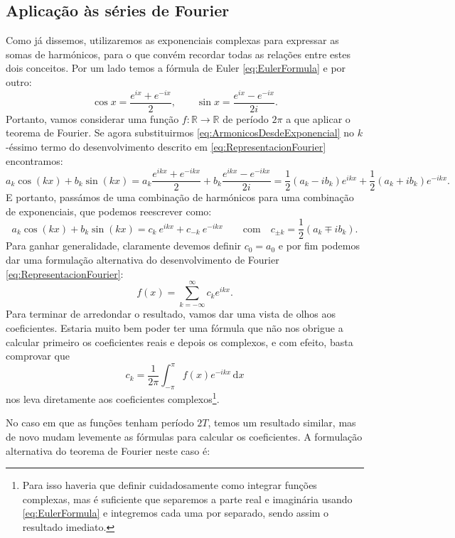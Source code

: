 \subsection{Aplicação às séries de Fourier}
Como já dissemos, utilizaremos as exponenciais complexas para expressar as somas de harmónicos, para o que convém recordar todas as relações entre estes dois conceitos. Por um lado temos a fórmula de Euler \eqref{eq:EulerFormula} e por outro:
\begin{equation}
  \label{eq:ArmonicosDesdeExponencial}
  \cos x = \frac{e^{ix} + e^{-ix}}{2}, \qquad \sin x = \frac{e^{ix} - e^{-ix}}{2i}.
\end{equation}
Portanto, vamos considerar uma função $f:\mathbb{R}\longrightarrow\mathbb{R}$ de período $2\pi$ a que aplicar o teorema de Fourier. Se agora substituirmos \eqref{eq:ArmonicosDesdeExponencial} no $k$-éssimo termo do desenvolvimento descrito em \eqref{eq:RepresentacionFourier} encontramos:
\[
a_k\cos(kx) + b_k\sin(kx) = a_k \frac{e^{ikx} + e^{-ikx}}{2} + b_k \frac{e^{ikx} - e^{-ikx}}{2i} = \frac{1}{2}(a_k-ib_k) e^{ikx} + \frac{1}{2}(a_k+ib_k) e^{-ikx}.
\]
E portanto, passámos de uma combinação de harmónicos para uma combinação de exponenciais, que podemos reescrever como:
\begin{equation}
  \label{eq:kesimoExponenciales}
  a_k\cos(kx) + b_k\sin(kx) = c_k\ e^{ikx} + c_{-k}\ e^{-ikx} \qquad \text{com}\quad c_{\pm k} = \frac{1}{2}(a_k \mp ib_k).
\end{equation}
Para ganhar generalidade, claramente devemos definir $c_0=a_0$ e por fim podemos dar uma formulação alternativa do desenvolvimento de Fourier \eqref{eq:RepresentacionFourier}:
\begin{equation}
  \label{eq:FourierComplejo}
  f(x) = \sum_{k=-\infty}^\infty c_k e^{ikx}.
\end{equation}
Para terminar de arredondar o resultado, vamos dar uma vista de olhos aos coeficientes. Estaria muito bem poder ter uma fórmula que não nos obrigue a calcular primeiro os coeficientes reais e depois os complexos, e com efeito, basta comprovar que
\[\boxed{
c_k = \frac{1}{2\pi} \int _{-\pi}^\pi f(x) e^{-ikx} \,\text{d}x
}\]
nos leva diretamente aos coeficientes complexos\footnote{Para isso haveria que definir cuidadosamente como integrar funções complexas, mas é suficiente que separemos a parte real e imaginária usando \eqref{eq:EulerFormula} e integremos cada uma por separado, sendo assim o resultado imediato.}.

No caso em que as funções tenham período $2T$, temos um resultado similar, mas de novo mudam levemente as fórmulas para calcular os coeficientes. A formulação alternativa do teorema de Fourier neste caso é:


